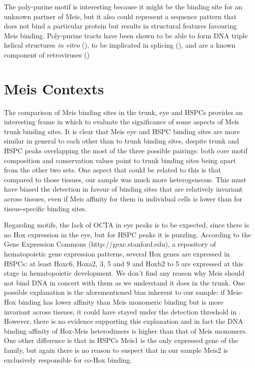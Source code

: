 
The poly-purine motif is interesting because it might be the binding site for an unknown partner of Meis, but it also could represent a sequence pattern that does not bind a particular protein but results in structural features favouring Meis binding. Poly-purine tracts have been shown to be able to form DNA triple helical structures \textit{in vitro} (\cite{ref}), to be implicated in splicing (\cite{ref}), and are a known component of retroviruses (\cite{ref})%


\section{Meis Contexts}

The comparison of Meis binding sites in the trunk, eye and \acp{HSPC} provides an interesting frame in which to evaluate the significance of some aspects of Meis trunk binding sites. It is clear that Meis eye and \ac{HSPC} binding sites are more similar in general to each other than to trunk binding sites, despite trunk and \ac{HSPC} peaks overlapping the most of the three possible pairings: both core motif composition and conservation values point to trunk binding sites being apart from the other two sets. One aspect that could be related to this is that compared to those tissues, our sample was much more heterogeneous. This must have biased the detection in favour of binding sites that are relatively invariant across tissues, even if Meis affinity for them in individual cells is lower than for tissue-specific binding sites. 

Regarding motifs, the lack of \ac{OCTA} in eye peaks is to be expected, since there is no Hox expression in the eye, but for \ac{HSPC} peaks it is puzzling. According to the Gene Expression Commons (http://gexc.stanford.edu), a repository of hematopoietic gene expression patterns, several Hox genes are expressed in \acp{HSPC}: at least Hoxc6, Hoxa2, 3, 5 and 9 and Hoxb2 to 5 are expressed at this stage in hematopoietic development. We don't find any reason why Meis should not bind DNA in concert with them as we understand it does in the trunk. One possible explanation is the aforementioned bias inherent to our sample: if Meis-Hox binding has lower affinity than Meis monomeric binding but is more invariant across tissues, it could have stayed under the detection threshold in \textcite{Wilson2010}. However, there is no evidence supporting this explanation and in fact the DNA binding affinity of Hox-Meis heterodimers is higher than that of Meis monomers. One other difference is that in \acp{HSPC} Meis1 is the only expressed gene of the family, but again there is no reason to suspect that in our sample Meis2 is exclusively responsible for co-Hox binding.

